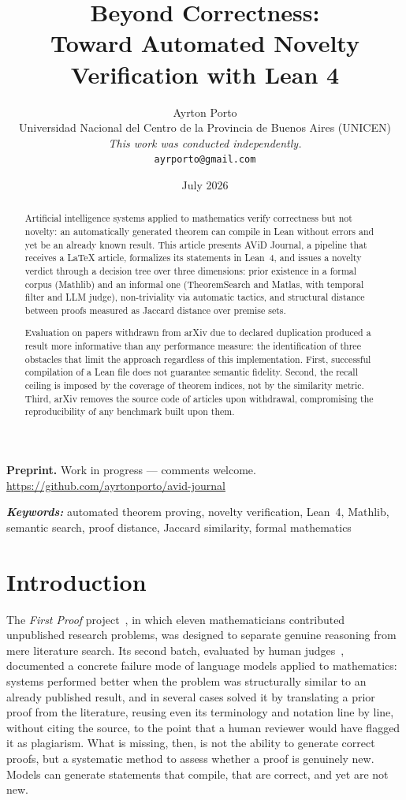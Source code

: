 \documentclass{article}
\title{Beyond Correctness:\\
Toward Automated Novelty Verification with Lean 4}
\author{
  Ayrton Porto\\
  \small
  Universidad Nacional del Centro de la Provincia de Buenos Aires (UNICEN)\\
  \small\textit{This work was conducted independently.}\\
  \texttt{ayrporto@gmail.com}
}
\date{July 2026}
\theoremstyle{remark}
\providecommand{\keywords}[1]{\par\addvspace{\medskipamount}
\noindent\textbf{\emph{Keywords:}} #1\par}
\begin{document}
\maketitle

\begin{center}
\small
\textbf{Preprint.} Work in progress --- comments welcome.\\
\url{https://github.com/ayrtonporto/avid-journal}
\end{center}

\begin{abstract}
Artificial intelligence systems applied to mathematics verify correctness but not novelty: an automatically generated theorem can compile in Lean without errors and yet be an already known result. This article presents AViD Journal, a pipeline that receives a LaTeX article, formalizes its statements in Lean~4, and issues a novelty verdict through a decision tree over three dimensions: prior existence in a formal corpus (Mathlib) and an informal one (TheoremSearch and Matlas, with temporal filter and LLM judge), non-triviality via automatic tactics, and structural distance between proofs measured as Jaccard distance over premise sets.

Evaluation on papers withdrawn from arXiv due to declared duplication produced a result more informative than any performance measure: the identification of three obstacles that limit the approach regardless of this implementation. First, successful compilation of a Lean file does not guarantee semantic fidelity. Second, the recall ceiling is imposed by the coverage of theorem indices, not by the similarity metric. Third, arXiv removes the source code of articles upon withdrawal, compromising the reproducibility of any benchmark built upon them.
\end{abstract}

\keywords{automated theorem proving, novelty verification, Lean~4, Mathlib, semantic search, proof distance, Jaccard similarity, formal mathematics}
\section{Introduction}

The \textit{First Proof} project~\cite{abouzaid2026}, in which eleven mathematicians contributed unpublished research problems, was designed to separate genuine reasoning from mere literature search. Its second batch, evaluated by human judges~\cite{firstproof2b}, documented a concrete failure mode of language models applied to mathematics: systems performed better when the problem was structurally similar to an already published result, and in several cases solved it by translating a prior proof from the literature, reusing even its terminology and notation line by line, without citing the source, to the point that a human reviewer would have flagged it as plagiarism. What is missing, then, is not the ability to generate correct proofs, but a systematic method to assess whether a proof is genuinely new. Models can generate statements that compile, that are correct, and yet are not new.
\end{document}
